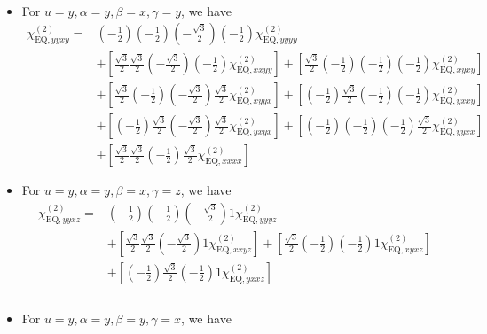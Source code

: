 \documentclass[UTF8,10pt,a4paper]{article}
\begin{document}
\begin{itemize}
\begin{align}
\end{align}\normalsize
\item For $u=y,\alpha=y,\beta=x,\gamma=y$, we have
\footnotesize\begin{align}
\nonumber\chi_{\text{EQ},yyxy}^{(2)}=&\left(-\frac{1}{2}\right)\left(-\frac{1}{2}\right)\left(-\frac{\sqrt{3}}{2}\right)\left(-\frac{1}{2}\right)\chi_{\text{EQ},yyyy}^{(2)}\\
\nonumber&+\left[\frac{\sqrt{3}}{2}\frac{\sqrt{3}}{2}\left(-\frac{\sqrt{3}}{2}\right)\left(-\frac{1}{2}\right)\chi_{\text{EQ},xxyy}^{(2)}\right]+\left[\frac{\sqrt{3}}{2}\left(-\frac{1}{2}\right)\left(-\frac{1}{2}\right)\left(-\frac{1}{2}\right)\chi_{\text{EQ},xyxy}^{(2)}\right]\\
\nonumber&+\left[\frac{\sqrt{3}}{2}\left(-\frac{1}{2}\right)\left(-\frac{\sqrt{3}}{2}\right)\frac{\sqrt{3}}{2}\chi_{\text{EQ},xyyx}^{(2)}\right]+\left[\left(-\frac{1}{2}\right)\frac{\sqrt{3}}{2}\left(-\frac{1}{2}\right)\left(-\frac{1}{2}\right)\chi_{\text{EQ},yxxy}^{(2)}\right]\\
\nonumber&+\left[\left(-\frac{1}{2}\right)\frac{\sqrt{3}}{2}\left(-\frac{\sqrt{3}}{2}\right)\frac{\sqrt{3}}{2}\chi_{\text{EQ},yxyx}^{(2)}\right]+\left[\left(-\frac{1}{2}\right)\left(-\frac{1}{2}\right)\left(-\frac{1}{2}\right)\frac{\sqrt{3}}{2}\chi_{\text{EQ},yyxx}^{(2)}\right]\\
&+\left[\frac{\sqrt{3}}{2}\frac{\sqrt{3}}{2}\left(-\frac{1}{2}\right)\frac{\sqrt{3}}{2}\chi_{\text{EQ},xxxx}^{(2)}\right]
\end{align}\normalsize
\item For $u=y,\alpha=y,\beta=x,\gamma=z$, we have
\footnotesize\begin{align}
\nonumber\chi_{\text{EQ},yyxz}^{(2)}=&\left(-\frac{1}{2}\right)\left(-\frac{1}{2}\right)\left(-\frac{\sqrt{3}}{2}\right)1\chi_{\text{EQ},yyyz}^{(2)}\\
\nonumber&+\left[\frac{\sqrt{3}}{2}\frac{\sqrt{3}}{2}\left(-\frac{\sqrt{3}}{2}\right)1\chi_{\text{EQ},xxyz}^{(2)}\right]+\left[\frac{\sqrt{3}}{2}\left(-\frac{1}{2}\right)\left(-\frac{1}{2}\right)1\chi_{\text{EQ},xyxz}^{(2)}\right]\\
\nonumber&+\left[\left(-\frac{1}{2}\right)\frac{\sqrt{3}}{2}\left(-\frac{1}{2}\right)1\chi_{\text{EQ},yxxz}^{(2)}\right]\\
\nonumber&\\
&
\end{align}\normalsize
\item For $u=y,\alpha=y,\beta=y,\gamma=x$, we have
\footnotesize\begin{align}

\end{align}
\end{itemize}
\end{document}
